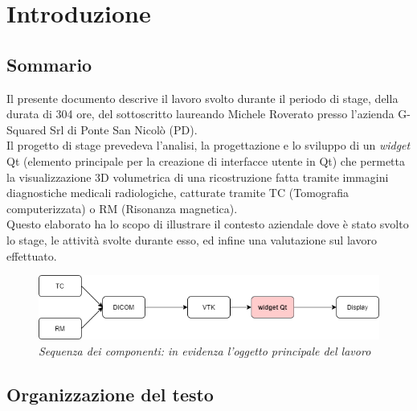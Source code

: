 
\chapter{Introduzione}
\label{cap:introduzione}

\section{Sommario}

Il presente documento descrive il lavoro svolto durante il periodo di stage, della durata di 304 ore, del sottoscritto laureando Michele Roverato presso l'azienda G-Squared Srl di Ponte San Nicolò (PD).
\\
Il progetto di stage prevedeva l'analisi, la progettazione e lo sviluppo di un \emph{widget} Qt (elemento principale per la creazione di interfacce utente in Qt) che permetta la visualizzazione 3D volumetrica di una ricostruzione fatta tramite immagini diagnostiche medicali radiologiche, catturate tramite TC (Tomografia computerizzata) o RM (Risonanza magnetica).
\\
Questo elaborato ha lo scopo di illustrare il contesto aziendale dove è stato svolto lo stage, le attività svolte durante esso, ed infine una valutazione sul lavoro effettuato.

\begin{figure}[ht]
    \centering
    \includegraphics[width=1\textwidth]{immagini/schemainiziale.png}
    \caption{\textit{Sequenza dei componenti: in evidenza l'oggetto principale del lavoro}}
\end{figure}

\section{Organizzazione del testo}

